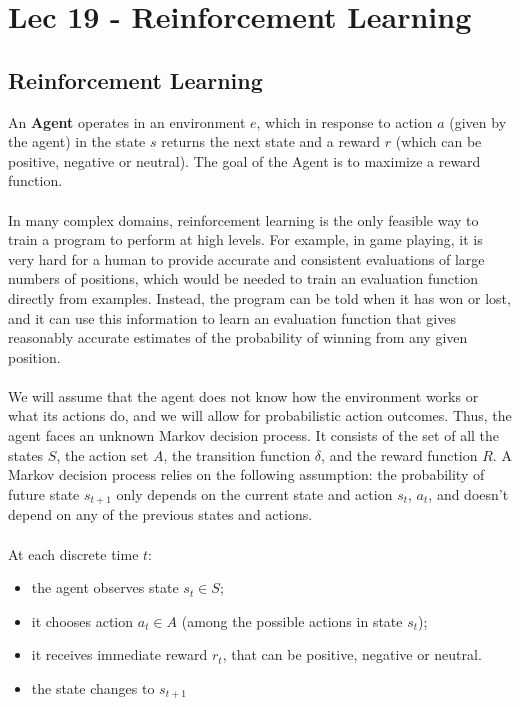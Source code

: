 \chapter{Lec 19 - Reinforcement Learning}

\section{Reinforcement Learning}
An \textbf{Agent} operates in an environment $e$, which in response to action $a$ (given by the agent) in the state $s$ returns the next state and a reward $r$ (which can be positive, negative or neutral). The goal of the Agent is to maximize a reward function.\\\\
In many complex domains, reinforcement learning is the only feasible way to train a program to perform at high levels. For example, in game playing, it is very hard for a human to provide accurate and consistent evaluations of large numbers of positions, which would be needed to train an evaluation function directly from examples.  Instead, the program can be told when it has won or lost, and it can use this information to learn an evaluation function that gives reasonably accurate estimates of the  probability of winning from any given position.\\\\
We will assume that the agent does not know how the environment works or what its actions do, and we will allow for probabilistic action outcomes. Thus, the agent faces an unknown Markov decision process. It consists of the set of all the states $S$, the action set $A$, the transition function $\delta$, and the reward function $R$. A Markov decision process relies on the following assumption: the probability of future state $s_{t+1}$ only depends on the current state and action $s_t$, $a_t$,  and doesn’t depend on any of the previous states and actions.\\\\
At each discrete time $t$:
\begin{itemize}
    \item the agent observes state $s_t \in S$;
    \item it chooses action $a_t \in A$ (among the possible actions in state $s_t$);
    \item  it receives immediate reward $r_t$, that can be positive, negative or neutral.
    \item  the state changes to $s_{t+1}$
\end{itemize}
